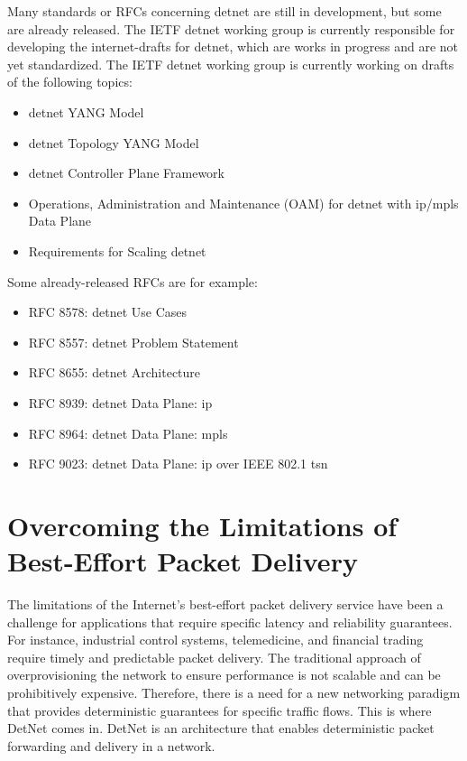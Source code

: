 \documentclass[runningheads]{llncs}
\begin{document}
Many standards or RFCs concerning \gls{detnet} are still in development, but some are already released. The IETF \gls{detnet} working group is currently responsible for developing the internet-drafts for \gls{detnet}, which are works in progress and are not yet standardized. The IETF \gls{detnet} working group is currently working on drafts of the following topics:
\begin{itemize}
  \item \gls{detnet} YANG Model
  \item \gls{detnet} Topology YANG Model
  \item \gls{detnet} Controller Plane Framework
  \item Operations, Administration and Maintenance (OAM) for \gls{detnet} with \gls{ip}/\gls{mpls} Data Plane
  \item Requirements for Scaling \gls{detnet}
\end{itemize}

Some already-released RFCs are for example:
\begin{itemize}
  \item RFC 8578: \gls{detnet} Use Cases~\cite{rfc8578}
  \item RFC 8557: \gls{detnet} Problem Statement~\cite{rfc8557}
  \item RFC 8655: \gls{detnet} Architecture~\cite{rfc8655}
  \item RFC 8939: \gls{detnet} Data Plane: \gls{ip}~\cite{rfc8939}
  \item RFC 8964: \gls{detnet} Data Plane: \gls{mpls}~\cite{rfc8964}
  \item RFC 9023: \gls{detnet} Data Plane: \gls{ip} over IEEE 802.1 \gls{tsn}~\cite{rfc9023}
\end{itemize}

\section{Overcoming the Limitations of Best-Effort Packet Delivery}
The limitations of the Internet's best-effort packet delivery service have been a challenge for applications that require specific latency and reliability guarantees. For instance, industrial control systems, telemedicine, and financial trading require timely and predictable packet delivery. The traditional approach of overprovisioning the network to ensure performance is not scalable and can be prohibitively expensive. Therefore, there is a need for a new networking paradigm that provides deterministic guarantees for specific traffic flows. This is where DetNet comes in. DetNet is an architecture that enables deterministic packet forwarding and delivery in a network.
\end{document}
